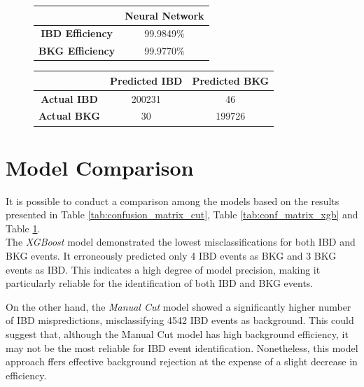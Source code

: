 \begin{figure}[h]
	\centering
	\small
	\hspace{-3cm}
	\begin{minipage}{0.3\textwidth}
		\centering
		\begin{tabular}{cc}
			\toprule
			& \textbf{Neural Network} \\
			\midrule
			\textbf{IBD Efficiency} & 99.9849\% \\
			\textbf{BKG Efficiency} & 99.9770\% \\
			\bottomrule
		\end{tabular}
	\end{minipage}
\hspace{2cm}
	\begin{minipage}{0.5\textwidth}
		\centering
		\begin{tabular}{ccc}
			\toprule
			& \textbf{Predicted IBD} & \textbf{Predicted BKG} \\
			\midrule
			\textbf{Actual IBD} & 200231 & 46 \\
			\textbf{Actual BKG} & 30 & 199726 \\
			\bottomrule
		\end{tabular}
		\label{tab:conf_matrix_nn}
	\end{minipage}
\hspace{-1cm}
\end{figure}
\vspace{-1cm}

\section{Model Comparison}
It is possible to conduct a comparison among the models based on the results presented in Table \ref{tab:confusion_matrix_cut}, Table \ref{tab:conf_matrix_xgb} and Table \ref{tab:conf_matrix_nn}.\\

The \textit{XGBoost} model demonstrated the lowest misclassifications for both IBD and BKG events. It erroneously predicted only 4 IBD events as BKG and 3 BKG events as IBD. This indicates a high degree of model precision, making it particularly reliable for the identification of both IBD and BKG events.

On the other hand, the \textit{Manual Cut} model showed a significantly higher number of IBD mispredictions, misclassifying 4542 IBD events as background. This could suggest that, although the Manual Cut model has high background efficiency, it may not be the most reliable for IBD event identification.
Nonetheless, this model approach ffers effective background rejection at the expense of a slight decrease in efficiency.


